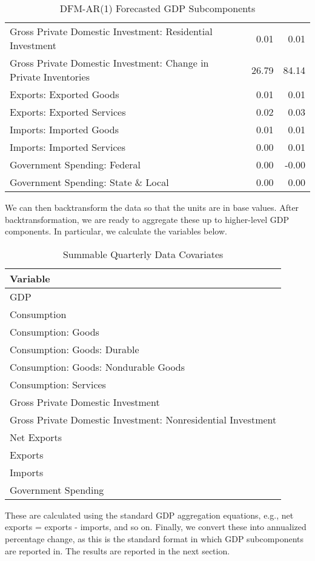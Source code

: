 \documentclass[11pt, letterpaper]{article}\usepackage[]{graphicx}\usepackage[]{color}
\begin{document}
\begin{table}[H]
\begin{tabular}{lrr}
  Gross Private Domestic Investment: Residential Investment & 0.01 & 0.01 \\ 
  Gross Private Domestic Investment: Change in Private Inventories & 26.79 & 84.14 \\ 
  Exports: Exported Goods & 0.01 & 0.01 \\ 
  Exports: Exported Services & 0.02 & 0.03 \\ 
  Imports: Imported Goods & 0.01 & 0.01 \\ 
  Imports: Imported Services & 0.00 & 0.01 \\ 
  Government Spending: Federal & 0.00 & -0.00 \\ 
  Government Spending: State \& Local & 0.00 & 0.00 \\ 
   \hline
\end{tabular}
\endgroup
\caption{DFM-AR(1) Forecasted GDP Subcomponents} 
\end{table}


We can then backtransform the data so that the units are in base values. After backtransformation, we are ready to aggregate these up to higher-level GDP components. In particular, we calculate the variables below.
\begin{table}[H]
\centering
\begingroup\scriptsize
\begin{tabular}{l}
  \hline
Variable \\ 
  \hline
GDP \\ 
  Consumption \\ 
  Consumption: Goods \\ 
  Consumption: Goods: Durable \\ 
  Consumption: Goods: Nondurable Goods \\ 
  Consumption: Services \\ 
  Gross Private Domestic Investment \\ 
  Gross Private Domestic Investment: Nonresidential Investment \\ 
  Net Exports \\ 
  Exports \\ 
  Imports \\ 
  Government Spending \\ 
   \hline
\end{tabular}
\endgroup
\caption{Summable Quarterly Data Covariates} 
\end{table}

These are calculated using the standard GDP aggregation equations, e.g., net exports = exports - imports, and so on.
Finally, we convert these into annualized percentage change, as this is the standard format in which GDP subcomponents are reported in. The results are reported in the next section.
\end{document}
